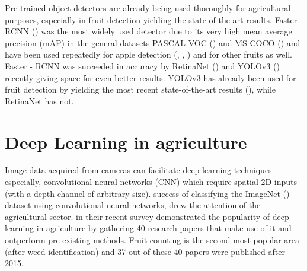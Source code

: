 Pre-trained object detectors are already being used thoroughly for agricultural purposes, especially in fruit detection yielding the state-of-the-art results. Faster - RCNN (\cite{ren2015faster}) was the most widely used detector due to its very high mean average precision (mAP) in the general datasets PASCAL-VOC (\cite{everingham2010pascal}) and MS-COCO (\cite{lin2014microsoft}) and have been used repeatedly for apple detection (\cite{sa2016deepfruits}, \cite{bargoti2017deep}, \cite{tao2018rapid}) and for other fruits as well. Faster - RCNN was succeeded in accuracy by RetinaNet (\cite{lin2017focal}) and YOLOv3 (\cite{redmon2018yolov3}) recently giving space for even better results. YOLOv3 has already been used for fruit detection by yielding the most recent state-of-the-art results (\cite{tian2019apple}), while RetinaNet has not. 


\section{Deep Learning in agriculture}
Image data acquired from cameras can facilitate deep learning techniques especially, convolutional neural networks (CNN) which require spatial 2D inputs (with a depth channel of arbitrary size). \cite{krizhevsky2012imagenet} success of classifying the ImageNet (\cite{deng2009imagenet}) dataset using convolutional neural networks, drew the attention of the agricultural sector. \cite{kamilaris2018deep} in their recent survey demonstrated the popularity of deep learning in agriculture by gathering 40 research papers that make use of it and outperform pre-existing methods. Fruit counting is the second most popular area (after weed identification) and 37 out of these 40 papers were published after 2015. 

